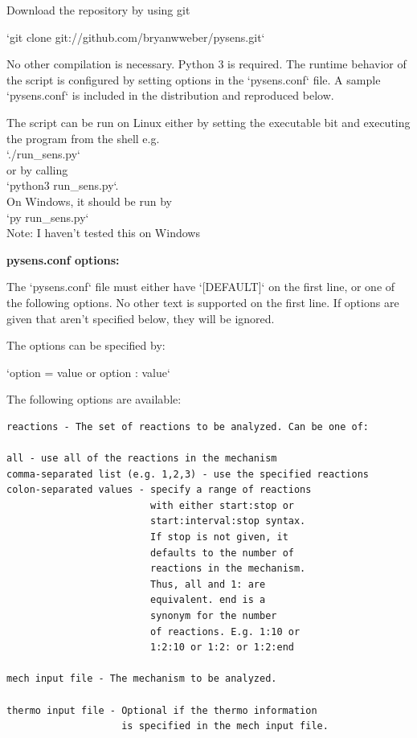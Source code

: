 \documentclass[12pt, letterpaper, oneside, draft]{book}
\begin{document}
\begin{appendices}
\begin{singlespace}
{Download the repository by using git

`git clone git://github.com/bryanwweber/pysens.git`

No other compilation is necessary. Python 3 is required.
The runtime behavior of the script is configured by setting options in
the `pysens.conf` file. A sample `pysens.conf` is included in the
distribution and reproduced below.

The script can be run on Linux either by setting the executable bit
and executing the program from the shell e.g.\\
`./run_sens.py`\\
or by calling\\
`python3 run_sens.py`.\\
On Windows, it should be run by\\
`py run_sens.py`\\
Note: I haven't tested this on Windows

\blankline

{\large \textbf{pysens.conf options:}}

The `pysens.conf` file must either have `[DEFAULT]` on the first line,
or one of the following options. No other text is supported on the first
line. If options are given that aren't specified below, they will be
ignored.

The options can be specified by:

`option = value or option : value`

The following options are available:

\begin{Verbatim}
reactions - The set of reactions to be analyzed. Can be one of:

all - use all of the reactions in the mechanism
comma-separated list (e.g. 1,2,3) - use the specified reactions
colon-separated values - specify a range of reactions
                         with either start:stop or
                         start:interval:stop syntax.
                         If stop is not given, it
                         defaults to the number of
                         reactions in the mechanism.
                         Thus, all and 1: are
                         equivalent. end is a
                         synonym for the number
                         of reactions. E.g. 1:10 or
                         1:2:10 or 1:2: or 1:2:end

mech input file - The mechanism to be analyzed.

thermo input file - Optional if the thermo information
                    is specified in the mech input file.


\end{Verbatim}}
\end{singlespace}
\end{appendices}
\end{document}
